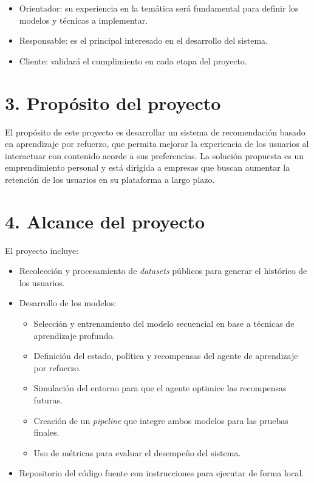 \documentclass[
11pt, %
]{charter}
\begin{document}
\begin{itemize}
	\item Orientador: su experiencia en la temática será fundamental para definir los modelos y técnicas a implementar.
	\item Responsable: es el principal interesado en el desarrollo del sistema.
	\item Cliente: validará el cumplimiento en cada etapa del proyecto.
\end{itemize}


\section{3. Propósito del proyecto}
\label{sec:proposito}

El propósito de este proyecto es desarrollar un sistema de recomendación basado en aprendizaje por refuerzo, que permita mejorar la experiencia de los usuarios al interactuar con contenido acorde a sus preferencias.
La solución propuesta es un emprendimiento personal y está dirigida a empresas que buscan aumentar la retención de los usuarios en su plataforma a largo plazo.

\section{4. Alcance del proyecto}
\label{sec:alcance}

El proyecto incluye:
\begin{itemize}
	\item Recolección y procesamiento de \textit{datasets} públicos para generar el histórico de los usuarios.
	\item Desarrollo de los modelos:
		\begin{itemize}
		\item Selección y entrenamiento del modelo secuencial en base a técnicas de aprendizaje profundo.
		\item Definición del estado, política y recompensas del agente de aprendizaje por refuerzo.
		\item Simulación del entorno para que el agente optimice las recompensas futuras.
		\item Creación de un \textit{pipeline} que integre ambos modelos para las pruebas finales.
		\item Uso de métricas para evaluar el desempeño del sistema.
		\end{itemize}
	\item Repositorio del código fuente con instrucciones para ejecutar de forma local.

\end{itemize}
\end{document}
